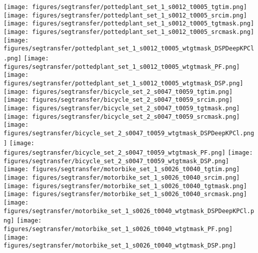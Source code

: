\documentclass[10pt,twocolumn,letterpaper]{article}
\begin{document}
\begin{figure*}[t]
\begin{center}
  \texttt{[image: figures/segtransfer/pottedplant\_set\_1\_s0012\_t0005\_tgtim.png]}
  \texttt{[image: figures/segtransfer/pottedplant\_set\_1\_s0012\_t0005\_srcim.png]}
  \texttt{[image: figures/segtransfer/pottedplant\_set\_1\_s0012\_t0005\_tgtmask.png]}
  \texttt{[image: figures/segtransfer/pottedplant\_set\_1\_s0012\_t0005\_srcmask.png]}
  \texttt{[image: figures/segtransfer/pottedplant\_set\_1\_s0012\_t0005\_wtgtmask\_DSPDeepKPCl.png]}
  \texttt{[image: figures/segtransfer/pottedplant\_set\_1\_s0012\_t0005\_wtgtmask\_PF.png]}
  \texttt{[image: figures/segtransfer/pottedplant\_set\_1\_s0012\_t0005\_wtgtmask\_DSP.png]}
\\


  \texttt{[image: figures/segtransfer/bicycle\_set\_2\_s0047\_t0059\_tgtim.png]}
  \texttt{[image: figures/segtransfer/bicycle\_set\_2\_s0047\_t0059\_srcim.png]}
  \texttt{[image: figures/segtransfer/bicycle\_set\_2\_s0047\_t0059\_tgtmask.png]}
  \texttt{[image: figures/segtransfer/bicycle\_set\_2\_s0047\_t0059\_srcmask.png]}
  \texttt{[image: figures/segtransfer/bicycle\_set\_2\_s0047\_t0059\_wtgtmask\_DSPDeepKPCl.png]}
  \texttt{[image: figures/segtransfer/bicycle\_set\_2\_s0047\_t0059\_wtgtmask\_PF.png]}
  \texttt{[image: figures/segtransfer/bicycle\_set\_2\_s0047\_t0059\_wtgtmask\_DSP.png]}
\\

  \texttt{[image: figures/segtransfer/motorbike\_set\_1\_s0026\_t0040\_tgtim.png]}
  \texttt{[image: figures/segtransfer/motorbike\_set\_1\_s0026\_t0040\_srcim.png]}
  \texttt{[image: figures/segtransfer/motorbike\_set\_1\_s0026\_t0040\_tgtmask.png]}
  \texttt{[image: figures/segtransfer/motorbike\_set\_1\_s0026\_t0040\_srcmask.png]}
  \texttt{[image: figures/segtransfer/motorbike\_set\_1\_s0026\_t0040\_wtgtmask\_DSPDeepKPCl.png]}
  \texttt{[image: figures/segtransfer/motorbike\_set\_1\_s0026\_t0040\_wtgtmask\_PF.png]}
  \texttt{[image: figures/segtransfer/motorbike\_set\_1\_s0026\_t0040\_wtgtmask\_DSP.png]}
\\


\end{center}
\end{figure*}
\end{document}

